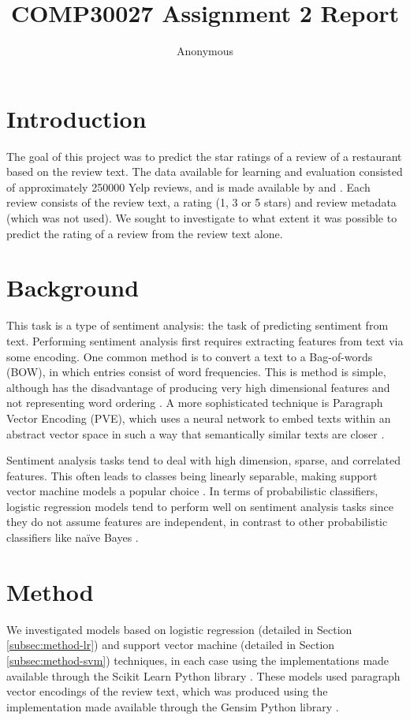 \documentclass[11pt]{article}
\title{COMP30027 Assignment 2 Report}
\author
{Anonymous}
\begin{document}
\maketitle

\section{Introduction}
The goal of this project was to predict the star ratings of a review of a restaurant based on the review text. The data available for learning and evaluation consisted of approximately 250000 Yelp reviews, and is made available by \cite{medhat_sentiment_2014} and \cite{rayana_collective_2015}. Each review consists of the review text, a rating (1, 3 or 5 stars) and review metadata (which was not used). We sought to investigate to what extent it was possible to predict the rating of a review from the review text alone. 

\section{Background}
This task is a type of sentiment analysis: the task of predicting sentiment from text. Performing sentiment analysis first requires extracting features from text via some encoding. One common method is to convert a text to a Bag-of-words (BOW), in which entries consist of word frequencies. This is method is simple, although has the disadvantage of producing very high dimensional features and not representing word ordering \cite{le_distributed_2014}. A more sophisticated technique is Paragraph Vector Encoding (PVE), which uses a neural network to embed texts within an abstract vector space in such a way that semantically similar texts are closer \cite{le_distributed_2014}.

Sentiment analysis tasks tend to deal with high dimension, sparse, and correlated features. This often leads to classes being linearly separable, making support vector machine models a popular choice \cite{medhat_sentiment_2014}. In terms of probabilistic classifiers, logistic regression models tend to perform well on sentiment analysis tasks since they do not assume features are independent, in contrast to other probabilistic classifiers like na\"{i}ve Bayes \cite{medhat_sentiment_2014}.

\section{Method} \label{sec:method}
We investigated models based on logistic regression (detailed in Section \ref{subsec:method-lr}) and support vector machine (detailed in Section \ref{subsec:method-svm}) techniques, in each case using the implementations made available through the Scikit Learn Python library \cite{sklearn_pedregosa_scikit-learn_2011}. These models used paragraph vector encodings of the review text, which was produced using the implementation made available through the Gensim Python library \cite{gensim_rehurek_software_2010}. 
\end{document}
